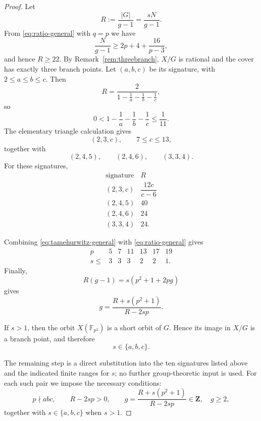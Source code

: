 \documentclass[11pt]{amsart}
\theoremstyle{remark}
\newcommand{\F}{\mathbb F}
\begin{document}
\begin{proof}
Let
\[
R:=\frac{|G|}{g-1}=\frac{sN}{g-1}.
\]
From \eqref{eq:ratio-general} with $q=p$ we have
\[
\frac{N}{g-1}\ge 2p+4+\frac{16}{p-3},
\]
and hence $R\ge22$. By Remark~\ref{rem:threebranch}, $X/G$ is
rational and the cover has exactly three branch points. Let
$(a,b,c)$ be its signature, with $2\le a\le b\le c$. Then
\[
R=\frac{2}{1-\frac1a-\frac1b-\frac1c},
\]
so
\begin{equation}\label{eq:signature-bound}
0<1-\frac1a-\frac1b-\frac1c\le\frac1{11}.
\end{equation}
The elementary triangle calculation gives
\[
(2,3,c),\qquad 7\le c\le13,
\]
together with
\[
(2,4,5),\qquad (2,4,6),\qquad (3,3,4).
\]
For these signatures,
\[
\begin{array}{c|c}
\text{signature} & R\\ \hline
(2,3,c) & \dfrac{12c}{c-6}\\[2mm]
(2,4,5) & 40\\
(2,4,6) & 24\\
(3,3,4) & 24.
\end{array}
\]

Combining \eqref{eq:tamehurwitz-general} with
\eqref{eq:ratio-general} gives
\[
\begin{array}{c|cccccc}
p&5&7&11&13&17&19\\ \hline
s\le&3&3&3&2&2&1.
\end{array}
\]
Finally,
\[
R(g-1)=s(p^2+1+2pg)
\]
gives
\begin{equation}\label{eq:g-from-R}
g=\frac{R+s(p^2+1)}{R-2sp}.
\end{equation}

If $s>1$, then the orbit $X(\F_{p^2})$ is a short orbit of $G$.
Hence its image in $X/G$ is a branch point, and therefore
\[
s\in\{a,b,c\}.
\]

The remaining step is a direct substitution into the ten signatures
listed above and the indicated finite ranges for $s$; no further
group-theoretic input is used. For each such pair we impose the
necessary conditions:
\[
p\nmid abc,\qquad
R-2sp>0,\qquad
g=\frac{R+s(p^2+1)}{R-2sp}\in\mathbf Z,\quad g\ge2,
\]
together with $s\in\{a,b,c\}$ when $s>1$.


\end{proof}
\end{document}
